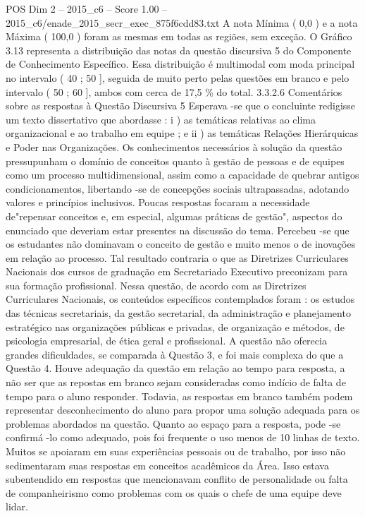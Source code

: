 \begin{textsample}{POS Dim 2 – 2015\_c6 – Score 1.00 – 2015\_c6/enade\_2015\_secr\_exec\_875f6cdd83.txt}
A nota Mínima ( 0,0 ) e a nota Máxima ( 100,0 ) foram as mesmas em todas as regiões, sem exceção.
O Gráfico 3.13 representa a distribuição das notas da questão discursiva 5 do Componente de Conhecimento Específico.
Essa distribuição é multimodal com moda principal no intervalo ( 40 ; 50 ], seguida de muito perto pelas questões em branco e pelo intervalo ( 50 ; 60 ], ambos com cerca de 17,5 \% do total. 3.3.2.6 Comentários sobre as respostas à Questão Discursiva 5 Esperava -se que o concluinte redigisse um texto dissertativo que abordasse : i ) as temáticas relativas ao clima organizacional e ao trabalho em equipe ; e ii ) as temáticas Relações Hierárquicas e Poder nas Organizações.
Os conhecimentos necessários à solução da questão pressupunham o domínio de conceitos quanto à gestão de pessoas e de equipes como um processo multidimensional, assim como a capacidade de quebrar antigos condicionamentos, libertando -se de concepções sociais ultrapassadas, adotando valores e princípios inclusivos.
Poucas respostas focaram a necessidade de"repensar conceitos e, em especial, algumas práticas de gestão", aspectos do enunciado que deveriam estar presentes na discussão do tema.
Percebeu -se que os estudantes não dominavam o conceito de gestão e muito menos o de inovações em relação ao processo.
Tal resultado contraria o que as Diretrizes Curriculares Nacionais dos cursos de graduação em Secretariado Executivo preconizam para sua formação profissional.
Nessa questão, de acordo com as Diretrizes Curriculares Nacionais, os conteúdos específicos contemplados foram : os estudos das técnicas secretariais, da gestão secretarial, da administração e planejamento estratégico nas organizações públicas e privadas, de organização e métodos, de psicologia empresarial, de ética geral e profissional.
A questão não oferecia grandes dificuldades, se comparada à Questão 3, e foi mais complexa do que a Questão 4.
Houve adequação da questão em relação ao tempo para resposta, a não ser que as repostas em branco sejam consideradas como indício de falta de tempo para o aluno responder.
Todavia, as respostas em branco também podem representar desconhecimento do aluno para propor uma solução adequada para os problemas abordados na questão.
Quanto ao espaço para a resposta, pode -se confirmá -lo como adequado, pois foi frequente o uso menos de 10 linhas de texto.
Muitos se apoiaram em suas experiências pessoais ou de trabalho, por isso não sedimentaram suas respostas em conceitos acadêmicos da Área.
Isso estava subentendido em respostas que mencionavam conflito de personalidade ou falta de companheirismo como problemas com os quais o chefe de uma equipe deve lidar.

\end{textsample}
